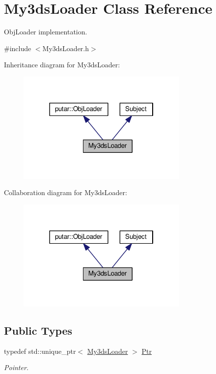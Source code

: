 \hypertarget{classMy3dsLoader}{}\section{My3ds\+Loader Class Reference}
\label{classMy3dsLoader}


Obj\+Loader implementation.  




{\ttfamily \#include $<$My3ds\+Loader.\+h$>$}



Inheritance diagram for My3ds\+Loader\+:
\nopagebreak
\begin{figure}[H]
\begin{center}
\leavevmode
\includegraphics[width=238pt]{classMy3dsLoader__inherit__graph}
\end{center}
\end{figure}


Collaboration diagram for My3ds\+Loader\+:
\nopagebreak
\begin{figure}[H]
\begin{center}
\leavevmode
\includegraphics[width=238pt]{classMy3dsLoader__coll__graph}
\end{center}
\end{figure}
\subsection*{Public Types}
\begin{DoxyCompactItemize}
\item 
typedef std\+::unique\+\_\+ptr$<$ \hyperlink{classMy3dsLoader}{My3ds\+Loader} $>$ \hyperlink{classMy3dsLoader_a975e85ff57c2fe95a09e5c2c26377441}{Ptr}\hypertarget{classMy3dsLoader_a975e85ff57c2fe95a09e5c2c26377441}{}\label{classMy3dsLoader_a975e85ff57c2fe95a09e5c2c26377441}

\begin{DoxyCompactList}\small\item\em Pointer. \end{DoxyCompactList}\end{DoxyCompactItemize}
